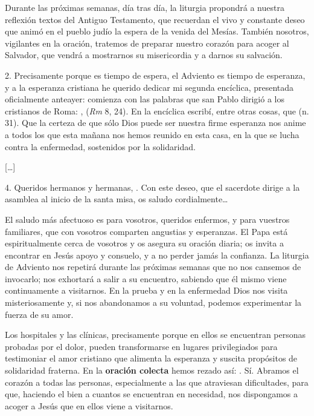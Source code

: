 \begin{body}
Durante las próximas semanas, día tras día, la liturgia propondrá a nuestra reflexión textos del Antiguo Testamento, que recuerdan el vivo y constante deseo que animó en el pueblo judío la espera de la venida del Mesías. También nosotros, vigilantes en la oración, tratemos de preparar nuestro corazón para acoger al Salvador, que vendrá a mostrarnos su misericordia y a darnos su salvación.

2. Precisamente porque es tiempo de espera, el Adviento es tiempo de esperanza, y a la esperanza cristiana he querido dedicar mi segunda encíclica, presentada oficialmente anteayer: comienza con las palabras que san Pablo dirigió a los cristianos de Roma: \emph{},  (\emph{Rm} 8, 24). En la encíclica escribí, entre otras cosas, que  (n. 31). Que la certeza de que sólo Dios puede ser nuestra firme esperanza nos anime a todos los que esta mañana nos hemos reunido en esta casa, en la que se lucha contra la enfermedad, sostenidos por la solidaridad.

{[}\ldots{}{]}

4. Queridos hermanos y hermanas, . Con este deseo, que el sacerdote dirige a la asamblea al inicio de la santa misa, os saludo cordialmente\ldots{}

El saludo más afectuoso es para vosotros, queridos enfermos, y para vuestros familiares, que con vosotros comparten angustias y esperanzas. El Papa está espiritualmente cerca de vosotros y os asegura su oración diaria; os invita a encontrar en Jesús apoyo y consuelo, y a no perder jamás la confianza. La liturgia de Adviento nos repetirá durante las próximas semanas que no nos cansemos de invocarlo; nos exhortará a salir a su encuentro, sabiendo que él mismo viene continuamente a visitarnos. En la prueba y en la enfermedad Dios nos visita misteriosamente y, si nos abandonamos a su voluntad, podemos experimentar la fuerza de su amor.

Los hospitales y las clínicas, precisamente porque en ellos se encuentran personas probadas por el dolor, pueden transformarse en lugares privilegiados para testimoniar el amor cristiano que alimenta la esperanza y suscita propósitos de solidaridad fraterna. En la \textbf{oración colecta} hemos rezado así: . Sí. Abramos el corazón a todas las personas, especialmente a las que atraviesan dificultades, para que, haciendo el bien a cuantos se encuentran en necesidad, nos dispongamos a acoger a Jesús que en ellos viene a visitarnos.


\end{body}
